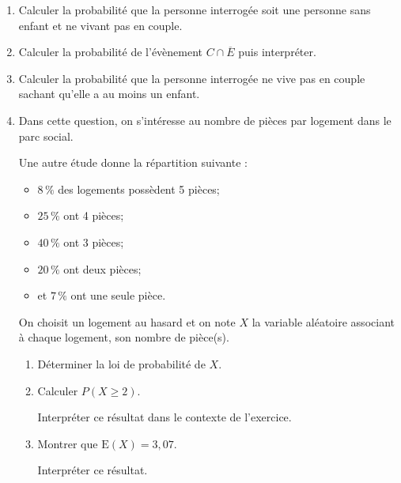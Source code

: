 	\begin{enumerate}
		\item Calculer la probabilité que la personne interrogée soit une personne sans enfant et ne vivant pas en couple.

		\item Calculer la probabilité de l'évènement $C \cap \overline{E}$ puis interpréter.

		\item Calculer la probabilité que la personne interrogée ne vive pas en couple sachant qu'elle a au moins un enfant.

		\item Dans cette question, on s'intéresse au nombre de pièces par logement dans le parc social.

		Une autre étude donne la répartition suivante :
		\begin{itemize}[label={\textbullet~}]
			\item $8\,\%$ des logements possèdent 5 pièces;
			\item $25\,\%$ ont 4 pièces;
			\item $40\,\%$ ont 3 pièces;
			\item $20\,\%$ ont deux pièces;
			\item et $7\,\%$ ont une seule pièce.
		\end{itemize}
		On choisit un logement au hasard et on note $X$ la variable aléatoire associant à chaque logement, son nombre de pièce(s).

		\begin{enumerate}
			\item Déterminer la loi de probabilité de $X$.

			\item Calculer $P(X \geqslant  2)$.

			Interpréter ce résultat dans le contexte de l'exercice.

			\item Montrer que $\mathrm{E}(X)=3,07$.

			Interpréter ce résultat.
		\end{enumerate}
	\end{enumerate}

